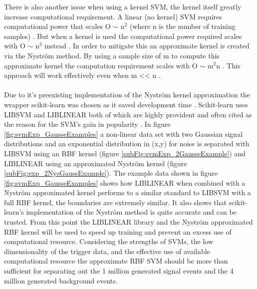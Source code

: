 There is also another issue when using a kernel SVM, the kernel itself greatly increase computational requirement. A linear (no kernel) SVM requires computational power that scales O $\sim$ n$^2$ (where n is the number of training samples) \cite{cortes1995support}. But when a kernel is used the computational power required scales with O $\sim$ n$^3$ instead \cite{williams2001using}. In order to mitigate this an approximate kernel is created via the Nyström method. By using a sample size of m to compute this approximate kernel the computation requirement scales with O $\sim$ m$^2$n \cite{williams2001using}. This approach will work effectively even when m << n \cite{williams2001using}. 
\\\\Due to it's preexisting implementation of the Nyström kernel approximation the wrapper scikit-learn was chosen as it saved development time \cite{scikit-learn}. Scikit-learn uses LIBSVM \cite{chang2011libsvm} and LIBLINEAR \cite{fan2008liblinear} both of which are highly provident and often cited as the reason for the SVM's gain in popularity \cite{murty2016support}. In figure \ref{fig:svmExp_GausseExamples} a non-linear data set with two Gaussian signal distributions and an exponential distribution in (x,y) for noise is separated with LIBSVM using an RBF kernel (figure \ref{subFig:svmExp_2GausseExample}) and LIBLINEAR using an approximated Nyström kernel (figure \ref{subFig:exp_2NysGaussExample}). The example data shown in figure \ref{fig:svmExp_GausseExamples} shows how LIBLINEAR when combined with a Nyström approximated kernel performs to a similar standard to LIBSVM with a full RBF kernel, the boundaries are extremely similar. It also shows that scikit-learn's implementation of the Nyström method is quite accurate and can be trusted. From this point the LIBLINEAR library and the Nyström approximated RBF kernel will be used to speed up training and prevent an excess use of computational resource. Considering the strengths of SVMs, the low dimensionality of the trigger data, and the effective use of available computational resource the approximate RBF SVM should be more than sufficient for separating out the 1 million generated signal events and the 4 million generated background events. 

